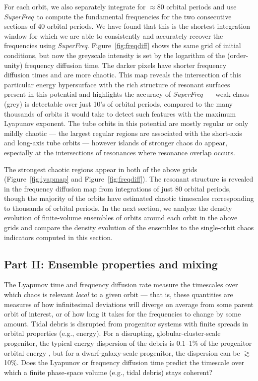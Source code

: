 \documentclass[letterpaper,12pt,preprint]{aastex}
\newcommand{\msun}{\ensuremath{\mathrm{M}_\odot}}
\newcommand{\project}[1]{\textsl{#1}}
\newcommand{\superfreq}{\project{SuperFreq}}
\begin{document}
For each orbit, we also separately integrate for $\approx$80 orbital periods and use \superfreq\ to compute the fundamental frequencies for the two consecutive sections of 40 orbital periods. We have found that this is the shortest integration window for which we are able to consistently and accurately recover the frequencies using \superfreq. Figure~\ref{fig:freqdiff} shows the same grid of initial conditions, but now the greyscale intensity is set by the logarithm of the (order-unity) frequency diffusion time. The darker pixels have shorter frequency diffusion times and are more chaotic. This map reveals the intersection of this particular energy hypersurface with the rich structure of resonant surfaces present in this potential and highlights the accuracy of \superfreq\ --- weak chaos (grey) is detectable over just 10's of orbital periods, compared to the many thousands of orbits it would take to detect such features with the maximum Lyapunov exponent. The tube orbits in this potential are mostly regular or only mildly chaotic --- the largest regular regions are associated with the short-axis and long-axis tube orbits --- however islands of stronger chaos do appear, especially at the intersections of resonances where resonance overlap occurs. 

The strongest chaotic regions appear in both of the above grids (Figure~\ref{fig:lyapmap} and Figure~\ref{fig:freqdiff}). The resonant structure is revealed in the frequency diffusion map from integrations of just 80 orbital periods, though the majority of the orbits have estimated chaotic timescales corresponding to thousands of orbital periods. In the next section, we analyze the density evolution of finite-volume ensembles of orbits around each orbit in the above grids and compare the density evolution of the ensembles to the single-orbit chaos indicators computed in this section.

\subsection{Part II: Ensemble properties and mixing} \label{sec:results2}

The Lyapunov time and frequency diffusion rate measure the timescales over which chaos is relevant \emph{local} to a given orbit --- that is, these quantities are measures of how infinitesimal deviations will diverge on average from some parent orbit of interest, or of how long it takes for the frequencies to change by some amount. Tidal debris is disrupted from progenitor systems with finite spreads in orbital properties (e.g., energy). For a disrupting, globular-cluster-scale progenitor, the typical energy dispersion of the debris is 0.1--1\% of the progenitor orbital energy \citep[assuming masses of $10^4$--$10^5$~\msun;][]{johnston98}, but for a dwarf-galaxy-scale progenitor, the dispersion can be $\gtrsim$10\%. Does the Lyapunov or frequency diffusion time predict the timescale over which a finite phase-space volume (e.g., tidal debris) stays coherent?
\end{document}
